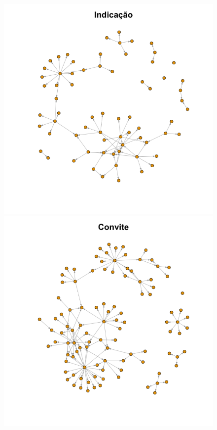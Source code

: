 \documentclass[a4paper, 12pt, openright, oneside, german, french, english, brazil]{abntex2}
\begin{document}
\begin{figure}[!ht]
		\includegraphics[scale=.35]{rede_indicacao.png}
		\includegraphics[scale=.35]{rede_convite.png}
	\end{figure}
	
\end{document}

